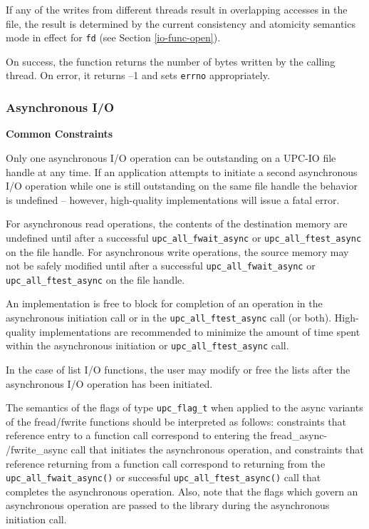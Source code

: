 \documentclass[12pt,titlepage]{article}
\newcounter{parnum}
\newcommand\np{\addtocounter{parnum}{1}\hspace{-2em}\makebox[2em][l]{\arabic{parnum}}}
\begin{document}
\np If any of the writes from different threads result in overlapping accesses
in the file, the result is determined by the current consistency and atomicity
semantics mode in effect for {\tt fd} (see Section \ref{io-func-open}).

\np On success, the function returns the number of bytes written by the
calling thread. On error, it returns --1 and sets {\tt errno} appropriately.

\subsubsection{Asynchronous I/O}

{\bf Common Constraints}

\np Only one asynchronous I/O operation can be outstanding on a UPC-IO file
handle at any time. If an application attempts to initiate a second
asynchronous I/O operation while one is still outstanding on the same file
handle the behavior is undefined -- however, high-quality implementations will
issue a fatal error.

\np For asynchronous read operations, the contents of the destination memory
are undefined until after a successful {\tt upc\_all\_fwait\_async} or \linebreak
{\tt upc\_all\_ftest\_async} on the file handle. For asynchronous write operations,
the source memory may not be safely modified until after a successful
{\tt upc\_all\_fwait\_async} or {\tt upc\_all\_ftest\_async} on the file handle.

\np An implementation is free to block for completion of an operation in the
asynchronous initiation call or in the {\tt upc\_all\_ftest\_async} call (or both).
High-quality implementations are recommended to minimize the amount of time
spent within the asynchronous initiation or {\tt upc\_all\_ftest\_async} call.

\np In the case of list I/O functions, the user may modify or free the lists
after the asynchronous I/O operation has been initiated.

\np The semantics of the flags of type {\tt upc\_flag\_t} when applied
    to the async variants of the fread/fwrite functions should be
    interpreted as follows: constraints that reference entry to a
    function call correspond to entering the fread\_async-
    /fwrite\_async call that initiates the asynchronous operation, and
    constraints that reference returning from a function call
    correspond to returning from the {\tt upc\_all\_fwait\_async()} or
    successful {\tt upc\_all\_ftest\_async()} call that completes the
    asynchronous operation. Also, note that the flags
    which govern an asynchronous operation are passed to the library
    during the asynchronous initiation call.
\end{document}
